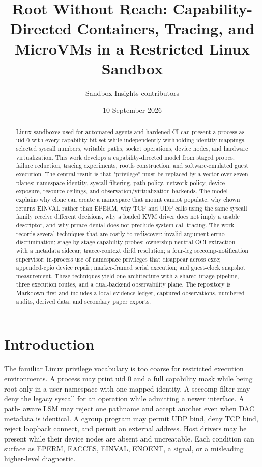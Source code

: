 \documentclass[10pt,twocolumn]{article}
\title{Root Without Reach: Capability-Directed Containers, Tracing, and MicroVMs in a Restricted Linux Sandbox}
\author{Sandbox Insights contributors}
\date{10 September 2026}
\begin{document}
\maketitle
\begin{abstract}
Linux sandboxes used for automated agents and hardened CI can present a process as uid 0 with every capability bit set while independently withholding identity mappings, selected syscall numbers, writable paths, socket operations, device nodes, and hardware virtualization. This work develops a capability-directed model from staged probes, failure reduction, tracing experiments, rootfs construction, and software-emulated guest execution. The central result is that "privilege" must be replaced by a vector over seven planes: namespace identity, syscall filtering, path policy, network policy, device exposure, resource ceilings, and observation/virtualization backends. The model explains why clone can create a namespace that mount cannot populate, why chown returns EINVAL rather than EPERM, why TCP and UDP calls using the same syscall family receive different decisions, why a loaded KVM driver does not imply a usable descriptor, and why ptrace denial does not preclude system-call tracing. The work records several techniques that are costly to rediscover: invalid-argument errno discrimination; stage-by-stage capability probes; ownership-neutral OCI extraction with a metadata sidecar; tracee-context dirfd resolution; a four-leg seccomp-notification supervisor; in-process use of namespace privileges that disappear across exec; appended-cpio device repair; marker-framed serial execution; and guest-clock snapshot measurement. These techniques yield one architecture with a shared image pipeline, three execution routes, and a dual-backend observability plane. The repository is Markdown-first and includes a local evidence ledger, captured observations, numbered audits, derived data, and secondary paper exports.

\end{abstract}
\small
\section{Introduction}
The familiar Linux privilege vocabulary is too coarse for restricted execution environments. A process may print uid 0 and a full capability mask while being root only in a user namespace with one mapped identity. A seccomp filter may deny the legacy syscall for an operation while admitting a newer interface. A path- aware LSM may reject one pathname and accept another even when DAC metadata is identical. A cgroup program may permit UDP bind, deny TCP bind, reject loopback connect, and permit an external address. Host drivers may be present while their device nodes are absent and uncreatable. Each condition can surface as EPERM, EACCES, EINVAL, ENOENT, a signal, or a misleading higher-level diagnostic.
\end{document}
